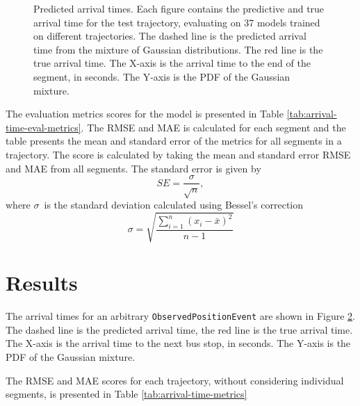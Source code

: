 \begin{figure}
\begin{subfigure}[b]{0.475\textwidth}
        \label{fig:result-4}
    \end{subfigure}
    \caption[ Predicted arrival times ]
    {{\small Predicted arrival times.
    Each figure contains the predictive and true arrival time for the test trajectory, evaluating on 37 models trained on different trajectories.
    The dashed line is the predicted arrival time from the mixture of Gaussian distributions.
    The red line is the true arrival time.
    The X-axis is the arrival time to the end of the segment, in seconds.
    The Y-axis is the PDF of the Gaussian mixture. }} 
    \label{fig:arrival-times}
\end{figure}

The evaluation metrics scores for the model is presented in Table \ref{tab:arrival-time-eval-metrics}.
The RMSE and MAE is calculated for each segment and the table presents the mean and standard error of the metrics for all segments in a trajectory.
The score is calculated by taking the mean and standard error RMSE and MAE from all segments.
The standard error is given by 
\begin{equation}
    SE = \frac{\sigma}{\sqrt{n}},
\end{equation}
where $\sigma$ is the standard deviation calculated using Bessel's correction
\begin{equation}
    \sigma = \sqrt{\frac{\sum_{i=1}^n (x_i - \bar{x})^2}{n - 1}}
\end{equation}

\section{Results}
The arrival times for an arbitrary \texttt{ObservedPositionEvent} are shown in Figure \ref{fig:arrival-times}.
The dashed line is the predicted arrival time, the red line is the true arrival time.
The X-axis is the arrival time to the next bus stop, in seconds.
The Y-axis is the PDF of the Gaussian mixture.

The RMSE and MAE scores for each trajectory, without considering individual segments, is presented in Table \ref{tab:arrival-time-metrics} 


